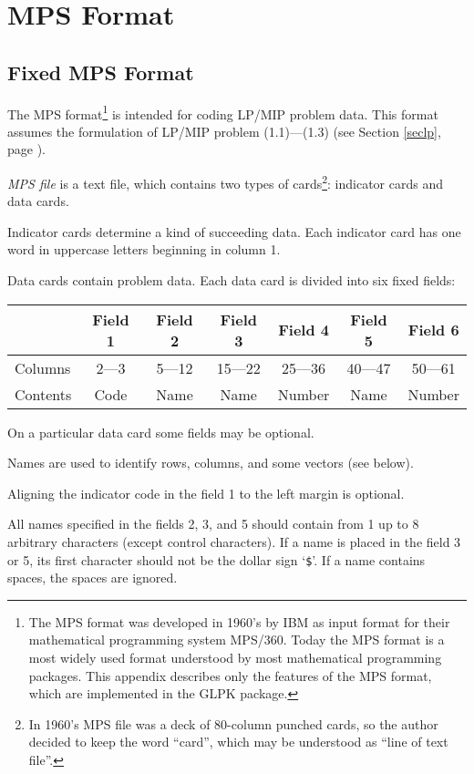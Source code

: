 
\chapter{MPS Format}
\label{champs}

\section{Fixed MPS Format}
\label{secmps}

The MPS format\footnote{The MPS format was developed in 1960's by IBM
as input format for their mathematical programming system MPS/360.
Today the MPS format is a most widely used format understood by most
mathematical programming packages. This appendix describes only the
features of the MPS format, which are implemented in the GLPK package.}
is intended for coding LP/MIP problem data. This format assumes the
formulation of LP/MIP problem (1.1)---(1.3) (see Section \ref{seclp},
page \pageref{seclp}).

{\it MPS file} is a text file, which contains two types of
cards\footnote{In 1960's MPS file was a deck of 80-column punched
cards, so the author decided to keep the word ``card'', which may be
understood as ``line of text file''.}: indicator cards and data cards.

Indicator cards determine a kind of succeeding data. Each indicator
card has one word in uppercase letters beginning in column 1.

Data cards contain problem data. Each data card is divided into six
fixed fields:

\begin{center}
\begin{tabular}{lcccccc}
& Field 1 & Field 2 & Field 3 & Field 4 & Field 5 & Field 6 \\
\hline
Columns & 2---3 & 5---12 & 15---22 & 25---36 & 40---47 & 50---61 \\
Contents & Code & Name & Name & Number & Name & Number \\
\end{tabular}
\end{center}

On a particular data card some fields may be optional.

Names are used to identify rows, columns, and some vectors (see below).

Aligning the indicator code in the field 1 to the left margin is
optional.

All names specified in the fields 2, 3, and 5 should contain from 1 up
to 8 arbitrary characters (except control characters). If a name is
placed in the field 3 or 5, its first character should not be the dollar
sign `\verb|$|'. If a name contains spaces, the spaces are ignored.

